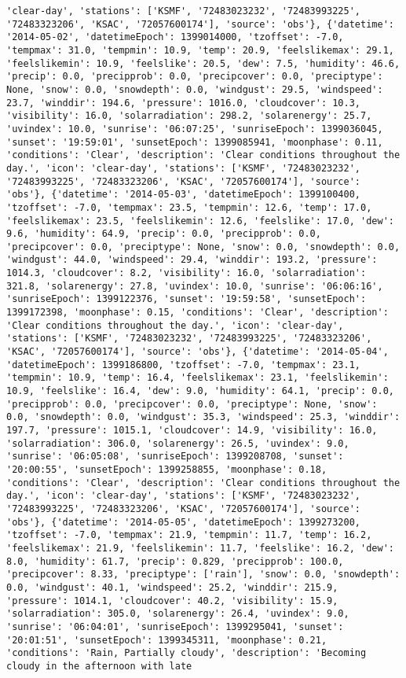 \documentclass[
  letterpaper,
  DIV=11,
  numbers=noendperiod]{scrartcl}
\begin{document}
\begin{verbatim}
'clear-day', 'stations': ['KSMF', '72483023232', '72483993225', '72483323206', 'KSAC', '72057600174'], 'source': 'obs'}, {'datetime': '2014-05-02', 'datetimeEpoch': 1399014000, 'tzoffset': -7.0, 'tempmax': 31.0, 'tempmin': 10.9, 'temp': 20.9, 'feelslikemax': 29.1, 'feelslikemin': 10.9, 'feelslike': 20.5, 'dew': 7.5, 'humidity': 46.6, 'precip': 0.0, 'precipprob': 0.0, 'precipcover': 0.0, 'preciptype': None, 'snow': 0.0, 'snowdepth': 0.0, 'windgust': 29.5, 'windspeed': 23.7, 'winddir': 194.6, 'pressure': 1016.0, 'cloudcover': 10.3, 'visibility': 16.0, 'solarradiation': 298.2, 'solarenergy': 25.7, 'uvindex': 10.0, 'sunrise': '06:07:25', 'sunriseEpoch': 1399036045, 'sunset': '19:59:01', 'sunsetEpoch': 1399085941, 'moonphase': 0.11, 'conditions': 'Clear', 'description': 'Clear conditions throughout the day.', 'icon': 'clear-day', 'stations': ['KSMF', '72483023232', '72483993225', '72483323206', 'KSAC', '72057600174'], 'source': 'obs'}, {'datetime': '2014-05-03', 'datetimeEpoch': 1399100400, 'tzoffset': -7.0, 'tempmax': 23.5, 'tempmin': 12.6, 'temp': 17.0, 'feelslikemax': 23.5, 'feelslikemin': 12.6, 'feelslike': 17.0, 'dew': 9.6, 'humidity': 64.9, 'precip': 0.0, 'precipprob': 0.0, 'precipcover': 0.0, 'preciptype': None, 'snow': 0.0, 'snowdepth': 0.0, 'windgust': 44.0, 'windspeed': 29.4, 'winddir': 193.2, 'pressure': 1014.3, 'cloudcover': 8.2, 'visibility': 16.0, 'solarradiation': 321.8, 'solarenergy': 27.8, 'uvindex': 10.0, 'sunrise': '06:06:16', 'sunriseEpoch': 1399122376, 'sunset': '19:59:58', 'sunsetEpoch': 1399172398, 'moonphase': 0.15, 'conditions': 'Clear', 'description': 'Clear conditions throughout the day.', 'icon': 'clear-day', 'stations': ['KSMF', '72483023232', '72483993225', '72483323206', 'KSAC', '72057600174'], 'source': 'obs'}, {'datetime': '2014-05-04', 'datetimeEpoch': 1399186800, 'tzoffset': -7.0, 'tempmax': 23.1, 'tempmin': 10.9, 'temp': 16.4, 'feelslikemax': 23.1, 'feelslikemin': 10.9, 'feelslike': 16.4, 'dew': 9.0, 'humidity': 64.1, 'precip': 0.0, 'precipprob': 0.0, 'precipcover': 0.0, 'preciptype': None, 'snow': 0.0, 'snowdepth': 0.0, 'windgust': 35.3, 'windspeed': 25.3, 'winddir': 197.7, 'pressure': 1015.1, 'cloudcover': 14.9, 'visibility': 16.0, 'solarradiation': 306.0, 'solarenergy': 26.5, 'uvindex': 9.0, 'sunrise': '06:05:08', 'sunriseEpoch': 1399208708, 'sunset': '20:00:55', 'sunsetEpoch': 1399258855, 'moonphase': 0.18, 'conditions': 'Clear', 'description': 'Clear conditions throughout the day.', 'icon': 'clear-day', 'stations': ['KSMF', '72483023232', '72483993225', '72483323206', 'KSAC', '72057600174'], 'source': 'obs'}, {'datetime': '2014-05-05', 'datetimeEpoch': 1399273200, 'tzoffset': -7.0, 'tempmax': 21.9, 'tempmin': 11.7, 'temp': 16.2, 'feelslikemax': 21.9, 'feelslikemin': 11.7, 'feelslike': 16.2, 'dew': 8.0, 'humidity': 61.7, 'precip': 0.829, 'precipprob': 100.0, 'precipcover': 8.33, 'preciptype': ['rain'], 'snow': 0.0, 'snowdepth': 0.0, 'windgust': 40.1, 'windspeed': 25.2, 'winddir': 215.9, 'pressure': 1014.1, 'cloudcover': 40.2, 'visibility': 15.9, 'solarradiation': 305.0, 'solarenergy': 26.4, 'uvindex': 9.0, 'sunrise': '06:04:01', 'sunriseEpoch': 1399295041, 'sunset': '20:01:51', 'sunsetEpoch': 1399345311, 'moonphase': 0.21, 'conditions': 'Rain, Partially cloudy', 'description': 'Becoming cloudy in the afternoon with late 
\end{verbatim}
\end{document}
